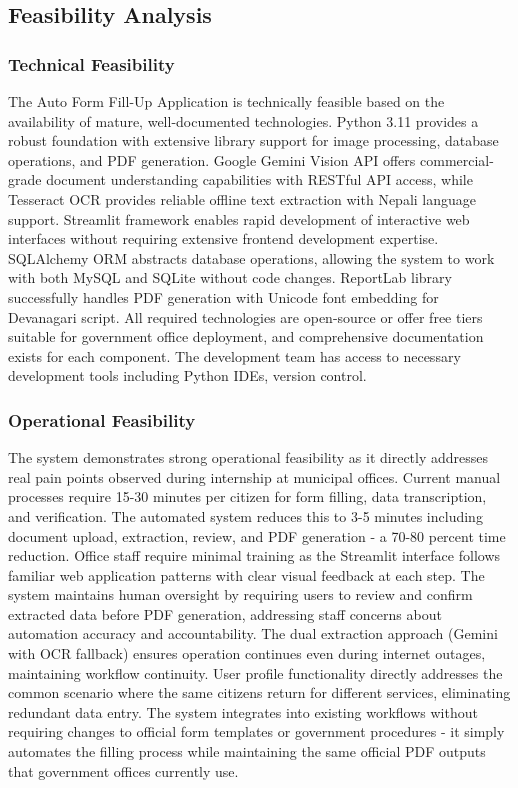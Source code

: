 \documentclass[12pt]{report}
\begin{document}
\subsection{Feasibility Analysis}
\subsubsection{Technical Feasibility}
The Auto Form Fill-Up Application is technically feasible based on the availability of mature, well-documented technologies. Python 3.11 provides a robust foundation with extensive library support for image processing, database operations, and PDF generation. Google Gemini Vision API offers commercial-grade document understanding capabilities with RESTful API access, while Tesseract OCR provides reliable offline text extraction with Nepali language support. Streamlit framework enables rapid development of interactive web interfaces without requiring extensive frontend development expertise. SQLAlchemy ORM abstracts database operations, allowing the system to work with both MySQL and SQLite without code changes. ReportLab library successfully handles PDF generation with Unicode font embedding for Devanagari script. All required technologies are open-source or offer free tiers suitable for government office deployment, and comprehensive documentation exists for each component. The development team has access to necessary development tools including Python IDEs, version control.


\subsubsection{Operational Feasibility}
The system demonstrates strong operational feasibility as it directly addresses real pain points observed during internship at municipal offices. Current manual processes require 15-30 minutes per citizen for form filling, data transcription, and verification. The automated system reduces this to 3-5 minutes including document upload, extraction, review, and PDF generation - a 70-80 percent time reduction. Office staff require minimal training as the Streamlit interface follows familiar web application patterns with clear visual feedback at each step. The system maintains human oversight by requiring users to review and confirm extracted data before PDF generation, addressing staff concerns about automation accuracy and accountability. The dual extraction approach (Gemini with OCR fallback) ensures operation continues even during internet outages, maintaining workflow continuity. User profile functionality directly addresses the common scenario where the same citizens return for different services, eliminating redundant data entry. The system integrates into existing workflows without requiring changes to official form templates or government procedures - it simply automates the filling process while maintaining the same official PDF outputs that government offices currently use.
\end{document}

